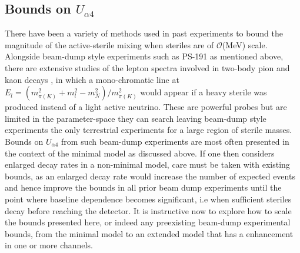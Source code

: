 \documentclass[11pt, a4paper]{article}
\newcommand{\refref}[1]{Ref.~\cite{#1}}
\def\ster{\ensuremath N}
\begin{document}
%
%
\subsection{Bounds on $U_{\alpha 4}$}

There have been a variety of methods used in past experiments to bound the
magnitude of the active-sterile mixing when steriles are of $\mathcal{O}$(MeV)
scale. Alongside beam-dump style experiments such as PS-191 as mentioned above,
there are extensive studies of the lepton spectra involved in two-body pion and
kaon decays\cite{PhysRevD.46.R885,PhysRevLett.68.3000} , in which a
mono-chromatic line at $E_l = \left( m_{\pi
(K)}^2+m_l^2-m_N^2\right)/m_{\pi(K)}^2$ would appear if a heavy sterile was
produced instead of a light active neutrino. These are powerful probes but are
limited in the parameter-space they can search leaving beam-dump style
experiments the only terrestrial experiments for a large region of sterile
masses. \\ 

Bounds on $U_{\alpha 4}$ from such beam-dump experiments are most often
presented in the context of the minimal model as discussed above. If one then
considers enlarged decay rates in a non-minimal model, care must be taken with
existing bounds, as an enlarged decay rate would increase the number of
expected events and hence improve the bounds in all prior beam dump experiments
until the point where baseline dependence becomes significant, i.e when
sufficient steriles decay before reaching the detector. It is instructive now
to explore how to scale the bounds presented here, or indeed any preexisting
beam-dump experimental bounds, from the minimal model to an extended model that
has a enhancement in one or more channels.
\end{document}
